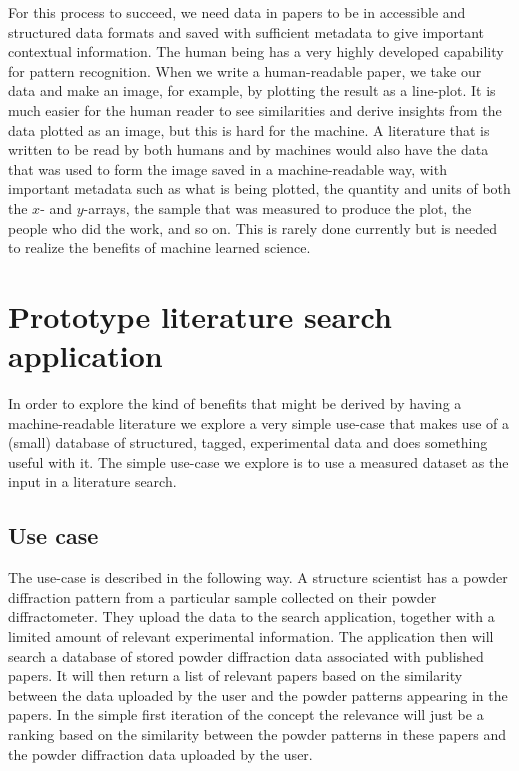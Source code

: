 \documentclass[preprint]{iucr}
\begin{document}
For this process to succeed, we need data in papers to be in accessible and structured data formats and saved with sufficient metadata to give important contextual information. The human being has a very highly developed capability for pattern recognition.  When we write a human-readable paper, we take our data and make an image, for example, by plotting the result as a line-plot.  It is much easier for the human reader to see similarities and derive insights from the data plotted as an image, but this is hard for the machine.  A literature that is written to be read by both humans and by machines would also have the data that was used to form the image saved in a machine-readable way, with important metadata such as what is being plotted, the quantity and units of both the $x$- and $y$-arrays, the sample that was measured to produce the plot, the people who did the work, and so on.  This is rarely done currently but is needed to realize the benefits of machine learned science.  

\section{Prototype literature search application}
In order to explore the kind of benefits that might be derived by having a machine-readable literature we explore a very simple use-case that makes use of a (small) database of structured, tagged, experimental data and does something useful with it.  The simple use-case we explore is to use a measured dataset as the input in a literature search.

\subsection{Use case}
\label{sec:uc}

The use-case is described in the following way.  A structure scientist has a powder diffraction pattern from a particular sample collected on their powder diffractometer. They upload the data to the search application, together with a limited amount of relevant experimental information. The application then will search a database of stored powder diffraction data associated with published papers. It will then return a list of relevant papers based on the similarity between the data uploaded by the user and the powder patterns appearing in the papers. In the simple first iteration of the concept the relevance will just be a ranking based on the similarity between the powder patterns in these papers and the powder diffraction data uploaded by the user.
\end{document}

